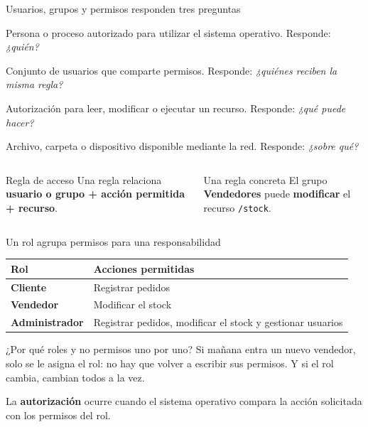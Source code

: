 \documentclass[aspectratio=169,10pt,c]{beamer}
\begin{document}
\begin{frame}{Usuarios, grupos y permisos responden tres preguntas}
\begin{description}\small
  \item[Usuario] Persona o proceso autorizado para utilizar el sistema operativo. Responde: \emph{¿quién?}
  \item[Grupo] Conjunto de usuarios que comparte permisos. Responde: \emph{¿quiénes reciben la misma regla?}
  \item[Permiso] Autorización para leer, modificar o ejecutar un recurso. Responde: \emph{¿qué puede hacer?}
  \item[Recurso compartido] Archivo, carpeta o dispositivo disponible mediante la red. Responde: \emph{¿sobre qué?}
\end{description}
\vspace{0.15cm}
\begin{columns}[T,onlytextwidth]
\begin{block}{Regla de acceso}
\small Una regla relaciona \textbf{usuario o grupo + acción permitida + recurso}.
\end{block}
\begin{exampleblock}{Una regla concreta}
\small El grupo \textbf{Vendedores} puede \textbf{modificar} el recurso \texttt{/stock}.
\end{exampleblock}
\end{columns}
\vspace{0.1cm}
\end{frame}

\begin{frame}{Un rol agrupa permisos para una responsabilidad}
\begin{center}
\small
\begin{tabular}{>{\bfseries}p{2.7cm}p{7.4cm}}
\toprule
Rol & Acciones permitidas \\
\midrule
Cliente & Registrar pedidos \\
Vendedor & Modificar el stock \\
Administrador & Registrar pedidos, modificar el stock y gestionar usuarios \\
\bottomrule
\end{tabular}
\end{center}
\vspace{0.15cm}
\begin{block}{¿Por qué roles y no permisos uno por uno?}
\small Si mañana entra un nuevo vendedor, solo se le asigna el rol: no hay que volver a escribir sus permisos. Y si el rol cambia, cambian todos a la vez.
\end{block}
\vspace{0.05cm}
\small La \textbf{autorización} ocurre cuando el sistema operativo compara la acción solicitada con los permisos del rol.
\end{frame}
\end{document}
